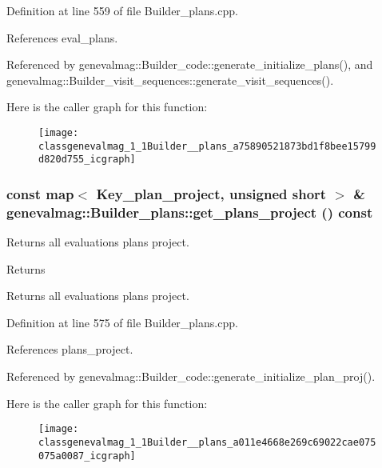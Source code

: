 Definition at line 559 of file Builder\_\-plans.cpp.



References eval\_\-plans.



Referenced by genevalmag::Builder\_\-code::generate\_\-initialize\_\-plans(), and genevalmag::Builder\_\-visit\_\-sequences::generate\_\-visit\_\-sequences().



Here is the caller graph for this function:\nopagebreak
\begin{figure}[H]
\begin{center}
\leavevmode
\texttt{[image: classgenevalmag\_1\_1Builder\_\_plans\_a75890521873bd1f8bee15799d820d755\_icgraph]}
\end{center}
\end{figure}


\hypertarget{classgenevalmag_1_1Builder__plans_a011e4668e269c69022cae075075a0087}{
\subsubsection[{get\_\-plans\_\-project}]{\setlength{\rightskip}{0pt plus 5cm}const map$<$ {\bf Key\_\-plan\_\-project}, unsigned short $>$ \& genevalmag::Builder\_\-plans::get\_\-plans\_\-project () const}}
\label{classgenevalmag_1_1Builder__plans_a011e4668e269c69022cae075075a0087}
Returns all evaluations plans project. \begin{DoxyReturn}{Returns}

\end{DoxyReturn}
Returns all evaluations plans project. 

Definition at line 575 of file Builder\_\-plans.cpp.



References plans\_\-project.



Referenced by genevalmag::Builder\_\-code::generate\_\-initialize\_\-plan\_\-proj().



Here is the caller graph for this function:\nopagebreak
\begin{figure}[H]
\begin{center}
\leavevmode
\texttt{[image: classgenevalmag\_1\_1Builder\_\_plans\_a011e4668e269c69022cae075075a0087\_icgraph]}
\end{center}
\end{figure}



